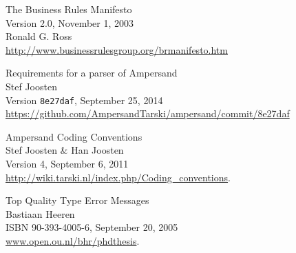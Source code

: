 \label{sec:bibliography}

\begin{thebibliography}{99}

	The Business Rules Manifesto\\
	Version 2.0, November 1, 2003\\
	Ronald G. Ross\\
	\url{http://www.businessrulesgroup.org/brmanifesto.htm}

	Requirements for a parser of Ampersand\\
	Stef Joosten\\
	Version \texttt{8e27daf}, September 25, 2014\\
	\url{https://github.com/AmpersandTarski/ampersand/commit/8e27daf}
	
	Ampersand Coding Conventions\\
	Stef Joosten \& Han Joosten\\
	Version 4, September 6, 2011\\
	\url{http://wiki.tarski.nl/index.php/Coding\_conventions}.

	Top Quality Type Error Messages\\
	Bastiaan Heeren\\
	ISBN 90-393-4005-6, September 20, 2005\\
	\url{www.open.ou.nl/bhr/phdthesis}.

\end{thebibliography}